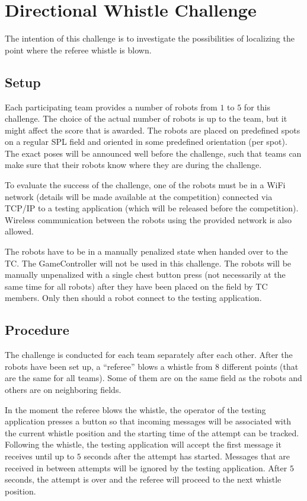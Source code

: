 \documentclass[12pt]{article}
\begin{document}
\newpage

\section{Directional Whistle Challenge}

The intention of this challenge is to investigate the possibilities of localizing the point where the referee whistle is blown.

\subsection{Setup}

Each participating team provides a number of robots from \(1\) to \(5\) for this challenge. The choice of the actual number of robots is up to the team, but it might affect the score that is awarded. The robots are placed on predefined spots on a regular SPL field and oriented in some predefined orientation (per spot). The exact poses will be announced well before the challenge, such that teams can make sure that their robots know where they are during the challenge.

To evaluate the success of the challenge, one of the robots must be in a WiFi network (details will be made available at the competition) connected via TCP/IP to a testing application (which will be released before the competition). Wireless communication between the robots using the provided network is also allowed.

The robots have to be in a manually penalized state when handed over to the TC. The GameController will not be used in this challenge. The robots will be manually unpenalized with a single chest button press (not necessarily at the same time for all robots) after they have been placed on the field by TC members. Only then should a robot connect to the testing application.

\subsection{Procedure}
The challenge is conducted for each team separately after each other. After the robots have been set up, a ``referee'' blows a whistle from \(8\) different points (that are the same for all teams). Some of them are on the same field as the robots and others are on neighboring fields.

In the moment the referee blows the whistle, the operator of the testing application presses a button so that incoming messages will be associated with the current whistle position and the starting time of the attempt can be tracked. Following the whistle, the testing application will accept the first message it receives until up to \(5\) seconds after the attempt has started. Messages that are received in between attempts will be ignored by the testing application. After \(5\) seconds, the attempt is over and the referee will proceed to the next whistle position.
\end{document}
